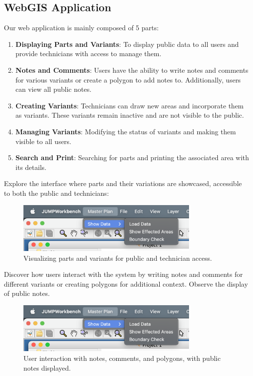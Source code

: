 \subsection{WebGIS Application}\label{subsec:fa-webgis-application}
Our web application is mainly composed of 5 parts:
\begin{enumerate}
    \item \textbf{Displaying Parts and Variants}: To display public data to all users and provide technicians with access to manage them.
    \item \textbf{Notes and Comments}: Users have the ability to write notes and comments for various variants or create a polygon to add notes to. Additionally, users can view all public notes.
    \item \textbf{Creating Variants}: Technicians can draw new areas and incorporate them as variants. These variants remain inactive and are not visible to the public.
    \item \textbf{Managing Variants}: Modifying the status of variants and making them visible to all users.
    \item \textbf{Search and Print}: Searching for parts and printing the associated area with its details.
\end{enumerate}

Explore the interface where parts and their variations are showcased, accessible to both the public and technicians:
\begin{figure}[H]
    \centering
    \includegraphics[width=0.8\textwidth]{res/plugin/01-menu}
    \caption{Visualizing parts and variants for public and technician access.}
    \label{fig:web-display}
\end{figure}


Discover how users interact with the system by writing notes and comments for different variants or creating polygons for additional context.
Observe the display of public notes.
\begin{figure}[H]
    \centering
    \includegraphics[width=0.8\textwidth]{res/plugin/01-menu}
    \caption{User interaction with notes, comments, and polygons, with public notes displayed.}
    \label{fig:web-notes}
\end{figure}


